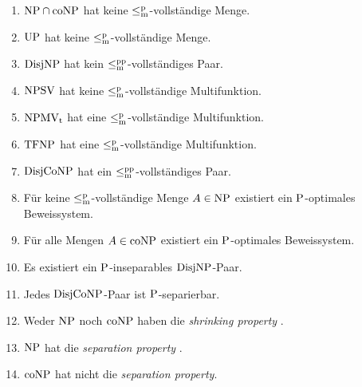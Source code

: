 \begin{corollary}
\begin{enumerate}[noitemsep,midpenalty=0]
        \item $\NP\cap\coNP$ hat keine $\leqmp$-vollständige Menge.
        \item $\UP$ hat keine $\leqmp$-vollständige Menge.
        \item $\DisjNP$ hat kein $\leqmpp$-vollständiges Paar.
        \item $\NPSV$ hat keine $\leqmp$-vollständige Multifunktion.
        \item $\NPMVt$ hat eine $\leqmp$-vollständige Multifunktion.
        \item $\TFNP$ hat eine $\leqmp$-vollständige Multifunktion.
        \item $\DisjCoNP$ hat ein $\leqmpp$-vollständiges Paar.
        \item Für keine $\leqmp$-vollständige Menge $A\in\NP$ existiert ein $\P$-optimales Beweissystem.
        \item Für alle Mengen $A\in\coNP$ existiert ein $\P$-optimales Beweissystem.
        \item Es existiert ein $\P$-inseparables $\DisjNP$-Paar.
        \item Jedes $\DisjCoNP$-Paar ist $\P$-separierbar.
        \item Weder $\NP$ noch $\coNP$ haben die \emph{shrinking property} \parencite{glaser_shrinking_2011}.
        \item $\NP$ hat die \emph{separation property} \parencite{glaser_shrinking_2011}.
        \item $\coNP$ hat nicht die \emph{separation property}.
    \end{enumerate}
\end{corollary}
